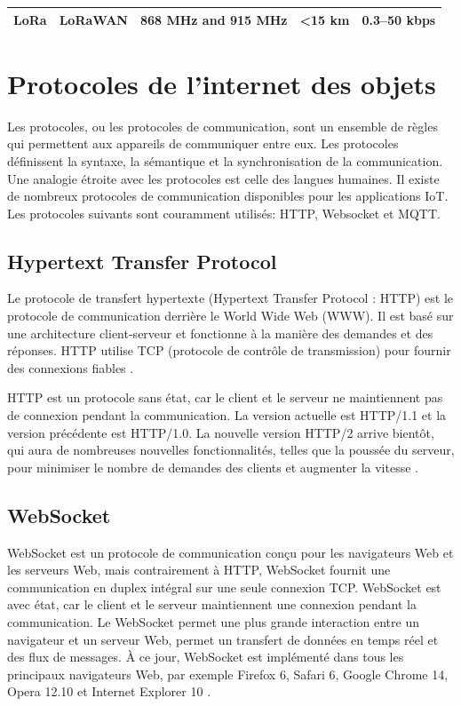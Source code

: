 \begin{table}[H]
\begin{tabular}{lllll}
\multicolumn{1}{|l|}{LoRa}& \multicolumn{1}{l|}{LoRaWAN}                                                                                                               & \multicolumn{1}{l|}{868 MHz and 915 MHz }                                                                                                                  & \multicolumn{1}{l|}{\textless{}15 km  }                     & \multicolumn{1}{l|}{0.3–50 kbps    }                                 \\ \hline                                                                                                            
\end{tabular}
\end{table}
\section{Protocoles de l'internet des objets}
Les protocoles, ou les protocoles de communication, sont un ensemble de règles qui permettent aux appareils de communiquer entre eux. Les protocoles définissent la syntaxe, la sémantique et la synchronisation de la communication. Une analogie étroite avec les protocoles est celle des langues humaines. Il existe de nombreux protocoles de communication disponibles pour les applications IoT. Les protocoles suivants sont couramment utilisés: HTTP, Websocket et MQTT.
\subsection{Hypertext Transfer Protocol}
Le protocole de transfert hypertexte (Hypertext Transfer Protocol : HTTP) est le protocole de communication derrière le World Wide Web (WWW). Il est basé sur une architecture client-serveur et fonctionne à la manière des demandes et des réponses. HTTP utilise TCP (protocole de contrôle de transmission) pour fournir des connexions fiables \cite{yokotani2016comparison}.


HTTP est un protocole sans état, car le client et le serveur ne maintiennent pas de connexion pendant la communication. La version actuelle est HTTP/1.1 et la version précédente est HTTP/1.0. La nouvelle version HTTP/2 arrive bientôt, qui aura de nombreuses nouvelles fonctionnalités, telles que la poussée du serveur, pour minimiser le nombre de demandes des clients et augmenter la vitesse \cite{daud2016internet}.

\subsection{WebSocket}
WebSocket est un protocole de communication conçu pour les navigateurs Web et les serveurs Web, mais contrairement à HTTP, WebSocket fournit une communication en duplex intégral sur une seule connexion TCP. WebSocket est avec état, car le client et le serveur maintiennent une connexion pendant la communication. Le WebSocket permet une plus grande interaction entre un navigateur et un serveur Web, permet un transfert de données en temps réel et des flux de messages. À ce jour, WebSocket est implémenté dans tous les principaux navigateurs Web, par exemple Firefox 6, Safari 6, Google Chrome 14, Opera 12.10 et Internet Explorer 10 \cite{longo2017stack4things,seo2018design}.
